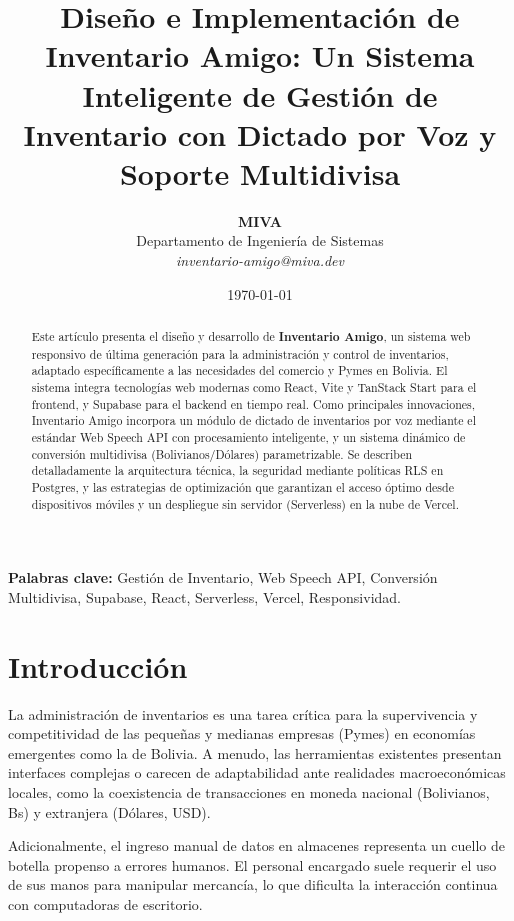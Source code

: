 \documentclass[11pt,a4paper]{article}
\title{\textbf{Diseño e Implementación de Inventario Amigo: Un Sistema Inteligente de Gestión de Inventario con Dictado por Voz y Soporte Multidivisa}}
\author{\textbf{MIVA} \\
Departamento de Ingeniería de Sistemas \\
\textit{inventario-amigo@miva.dev}}
\date{\today}
\begin{document}
\maketitle

\begin{abstract}
Este artículo presenta el diseño y desarrollo de \textbf{Inventario Amigo}, un sistema web responsivo de última generación para la administración y control de inventarios, adaptado específicamente a las necesidades del comercio y Pymes en Bolivia. El sistema integra tecnologías web modernas como React, Vite y TanStack Start para el frontend, y Supabase para el backend en tiempo real. Como principales innovaciones, Inventario Amigo incorpora un módulo de dictado de inventarios por voz mediante el estándar Web Speech API con procesamiento inteligente, y un sistema dinámico de conversión multidivisa (Bolivianos/Dólares) parametrizable. Se describen detalladamente la arquitectura técnica, la seguridad mediante políticas RLS en Postgres, y las estrategias de optimización que garantizan el acceso óptimo desde dispositivos móviles y un despliegue sin servidor (Serverless) en la nube de Vercel.
\end{abstract}

\textbf{Palabras clave:} Gestión de Inventario, Web Speech API, Conversión Multidivisa, Supabase, React, Serverless, Vercel, Responsividad.

\newpage

\section{Introducción}
La administración de inventarios es una tarea crítica para la supervivencia y competitividad de las pequeñas y medianas empresas (Pymes) en economías emergentes como la de Bolivia. A menudo, las herramientas existentes presentan interfaces complejas o carecen de adaptabilidad ante realidades macroeconómicas locales, como la coexistencia de transacciones en moneda nacional (Bolivianos, Bs) y extranjera (Dólares, USD). 

Adicionalmente, el ingreso manual de datos en almacenes representa un cuello de botella propenso a errores humanos. El personal encargado suele requerir el uso de sus manos para manipular mercancía, lo que dificulta la interacción continua con computadoras de escritorio.
\end{document}
